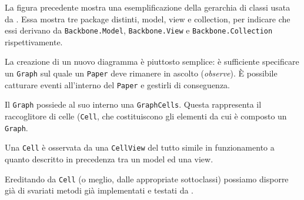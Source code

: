 La figura precedente mostra una esemplificazione della gerarchia di classi usata da \proj. Essa mostra tre package distinti, model, view e collection, per indicare che essi derivano da \texttt{Backbone.Model}, \texttt{Backbone.View} e \texttt{Backbone.Collection} rispettivamente.

La creazione di un nuovo diagramma è piuttosto semplice: è sufficiente specificare un \texttt{Graph} sul quale un \texttt{Paper} deve rimanere in ascolto (\emph{observe}). È possibile catturare eventi all'interno del \texttt{Paper} e gestirli di conseguenza.

Il \texttt{Graph} possiede al suo interno una \texttt{GraphCells}. Questa rappresenta il raccoglitore di celle (\texttt{Cell}, che costituiscono gli elementi da cui è composto un \texttt{Graph}. 

Una \texttt{Cell} è osservata da una \texttt{CellView} del tutto simile in funzionamento a quanto descritto in precedenza tra un model ed una view. 

Ereditando da \texttt{Cell} (o meglio, dalle appropriate sottoclassi) possiamo disporre già di svariati metodi già implementati e testati da \jointjs{}.